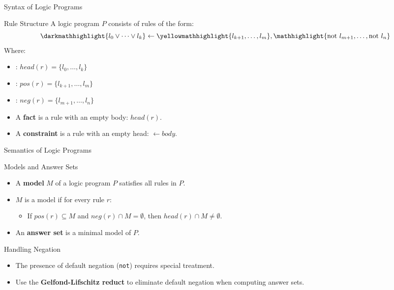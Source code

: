 \begin{frame}{Syntax of Logic Programs}
    \begin{alertblock}{Rule Structure}
        A logic program \(P\) consists of rules of the form:
        \[
            \darkmathhighlight{l_0 \lor \dots \lor l_k} \leftarrow \yellowmathhighlight{l_{k+1}, \dots, l_m}, \mathhighlight{\text{not } l_{m+1}, \dots, \text{not } l_n}
        \]
        Where:
        \begin{itemize}
            \item {}: \(head(r) = \{l_0, \dots, l_k\}\)
            \item {}: \(pos(r) = \{l_{k+1}, \dots, l_m\}\)
            \item {}: \(neg(r) = \{l_{m+1}, \dots, l_n\}\)
        \end{itemize}
    \end{alertblock}
    \begin{itemize}
        \item A \textbf{fact} is a rule with an empty body: \(head(r).\)
        \item A \textbf{constraint} is a rule with an empty head: \(\leftarrow body.\)
    \end{itemize}
\end{frame}

\begin{frame}{Semantics of Logic Programs}
    \begin{block}{Models and Answer Sets}
        \begin{itemize}
            \item A \textbf{model} \(M\) of a logic program \(P\) satisfies all rules in \(P\).
            \item \(M\) is a model if for every rule \(r\):
                  \begin{itemize}
                      \item If \(pos(r) \subseteq M\) and \(neg(r) \cap M = \emptyset\), then \(head(r) \cap M \neq \emptyset\).
                  \end{itemize}
            \item An \textbf{answer set} is a minimal model of \(P\).
        \end{itemize}
    \end{block}
    \begin{block}{Handling Negation}
        \begin{itemize}
            \item The presence of default negation (\texttt{not}) requires special treatment.
            \item Use the \textbf{Gelfond-Lifschitz reduct} to eliminate default negation when computing answer sets.
        \end{itemize}
    \end{block}
\end{frame}

